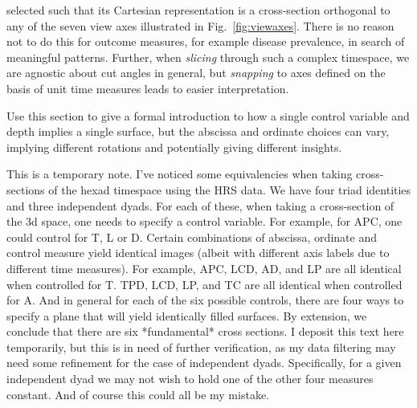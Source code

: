 \documentclass{bmcart}
\begin{document}
selected such that its Cartesian representation is a cross-section orthogonal to any of the seven view axes illustrated in Fig.~\ref{fig:viewaxes}. There is no reason not to do this for outcome measures, for example disease prevalence, in search of meaningful patterns. Further, when \emph{slicing} through such a complex timespace, we are agnostic about cut angles in general, but \emph{snapping} to axes defined on the basis of unit time measures leads to easier interpretation.

Use this section to give a formal introduction to how a single control variable and depth implies a single surface, but the abscissa and ordinate choices can vary, implying different rotations and potentially giving different insights.

This is a temporary note. I've noticed some equivalencies when taking cross-sections of the hexad timespace using the HRS data. We have four triad identities and three independent dyads. For each of these, when taking a cross-section of the 3d space, one needs to specify a control variable. For example, for APC, one could control for T, L or D. Certain combinations of abscissa, ordinate and control measure yield identical images (albeit with different axis labels due to different time measures). For example, APC, LCD, AD, and LP are all identical when controlled for T. TPD, LCD, LP, and TC are all identical when controlled for A. And in general for each of the six possible controls, there are four ways to specify a plane that will yield identically filled surfaces. By extension, we conclude that there are six *fundamental* cross sections. I deposit this text here temporarily, but this is in need of further verification, as my data filtering may need some refinement for the case of independent dyads. Specifically, for a given independent dyad we may not wish to hold one of the other four measures constant. And of course this could all be my mistake.
\end{document}
